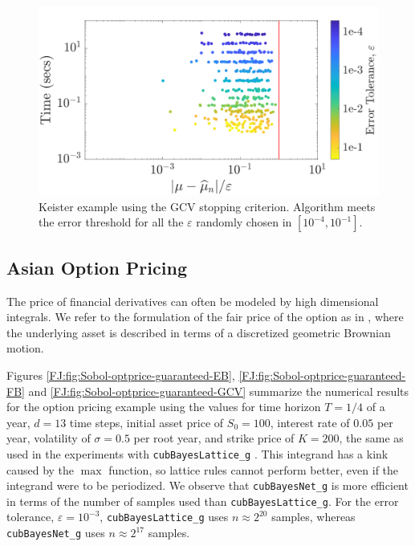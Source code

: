 \documentclass[graybox,footinfo]{svmult}
\begin{document}
\begin{figure}
\centering
\includegraphics[width=0.95\linewidth]{"figures/Sobol/Sobol_Keister_guaranteed_time_GCV__d4_r1_2019-Sep-1"}
\caption[Sobol: Keister guaranteed: GCV]{Keister example using the GCV stopping criterion. Algorithm meets the error threshold for all the $\varepsilon$ randomly chosen in $[10^{-4}, 10^{-1}]$.}
\label{FJ:fig:Sobol-keister-guaranteed-GCV}
\end{figure}







\subsection{Asian Option Pricing}

The price of financial derivatives can often be modeled by high dimensional integrals. 
We refer to the formulation of the fair price of the option as in \cite{RatHic19a}, where the underlying asset is described in terms of a discretized geometric Brownian motion.


Figures \ref{FJ:fig:Sobol-optprice-guaranteed-EB}, \ref{FJ:fig:Sobol-optprice-guaranteed-FB} and 
\ref{FJ:fig:Sobol-optprice-guaranteed-GCV} summarize the numerical results for the option pricing example using the values for
time horizon $T = 1/4$ of a year, $d = 13$ time steps, initial asset price of $S_0 = 100$, interest rate of $0.05$ per year, volatility of $\sigma = 0.5$ per root year, and strike price of  $K = 200$, the same as used in the experiments with \texttt{cubBayesLattice\_g} \cite{RatHic19a}.
This integrand has a kink caused by the $\max$ function, so lattice rules cannot perform better, even if the integrand were to be periodized.  We observe that \texttt{cubBayesNet\_g} is more efficient in terms of the number of samples used than \texttt{cubBayesLattice\_g}.  For the error tolerance, $\varepsilon=10^{-3}$,  \texttt{cubBayesLattice\_g} uses $n \approx 2^{20}$ samples, whereas \texttt{cubBayesNet\_g} uses $n \approx 2^{17}$ samples.
\end{document}
